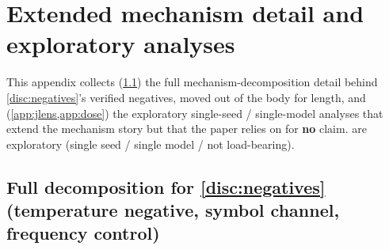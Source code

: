 \section{Extended mechanism detail and exploratory analyses}\label{app:mechanism}

This appendix collects (\cref{app:decomposition}) the full mechanism-decomposition
detail behind \cref{disc:negatives}'s verified negatives, moved out of the body for
length, and (\cref{app:jlens,app:dose}) the exploratory single-seed / single-model
analyses that extend the mechanism story but that the paper relies on for
\textbf{no} claim.  are exploratory (single seed / single
model / not load-bearing).

\subsection{Full decomposition for \cref{disc:negatives} (temperature negative,
symbol channel, frequency control)}\label{app:decomposition}

